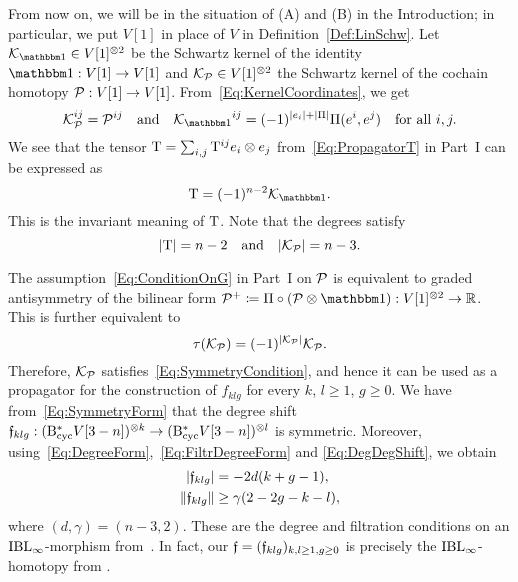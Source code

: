 \documentclass[\MainFolder/Text.tex]{subfiles}
\begin{document}
From now on, we will be in the situation of (A) and (B) in the Introduction; in particular, we put $V[1]$ in place of $V$ in Definition~\ref{Def:LinSchw}. Let $\Kern_{\Id} \in V[1]^{\otimes 2}$ be the Schwartz kernel of the identity $\Id: V[1]\rightarrow V[1]$ and $\mathcal{K}_{\mathcal{P}} \in V[1]^{\otimes 2}$ the Schwartz kernel of the cochain homotopy $\mathcal{P}: V[1] \rightarrow V[1]$. From~\eqref{Eq:KernelCoordinates}, we get
\begin{equation*} 
\Kern_{\Htp}^{ij} = \Htp^{ij} \quad \text{and} \quad {\Kern_{\Id}}^{ij} = (-1)^{\Abs{e_i} + \Abs{\Pair}} \Pair(e^i,e^j)\quad\text{for all }i,j. 
\end{equation*}
We see that the tensor $\mathrm{T} = \sum_{i,j} \mathrm{T}^{ij} e_i \otimes e_j$ from~\eqref{Eq:PropagatorT} in Part~I can be expressed as
\begin{equation*}
\TKer = (-1)^{n-2} \Kern_{\Id}.
\end{equation*}
This is the invariant meaning of $\mathrm{T}$. Note that the degrees satisfy 
$$ |\mathrm{T}| = n-2\quad\text{and}\quad |\mathcal{K}_{\mathcal{P}}| = n - 3. $$

The assumption~\eqref{Eq:ConditionOnG} in Part~I on $\mathcal{P}$ is equivalent to graded antisymmetry of the bilinear form $\Htp^+\coloneqq \Pair\circ (\Htp\otimes \Id): V[1]^{\otimes 2} \rightarrow \R$. This is further equivalent to
$$ \tau(\mathcal{K}_{\mathcal{P}}) = (-1)^{|\mathcal{K}_{\mathcal{P}}|}\mathcal{K}_{\mathcal{P}}. $$
Therefore, $\mathcal{K}_{\mathcal{P}}$ satisfies~\eqref{Eq:SymmetryCondition}, and hence it can be used as a propagator for the construction of $f_{klg}$ for every $k$, $l\ge 1$, $g\ge 0$. We have from~\eqref{Eq:SymmetryForm} that the degree shift $\mathfrak{f}_{klg}: (\mathrm{B}_{\mathrm{cyc}}^* V[3-n])^{\otimes k} \rightarrow (\mathrm{B}_{\mathrm{cyc}}^* V[3-n])^{\otimes l}$ is symmetric. Moreover, using~\eqref{Eq:DegreeForm},~\eqref{Eq:FiltrDegreeForm} and \eqref{Eq:DegDegShift}, we obtain
$$\begin{aligned}
|\mathfrak{f}_{klg}| &= - 2d(k+g-1), \\
\| \mathfrak{f}_{klg} \|&\ge \gamma (2-2g-k-l),
\end{aligned}$$
where $(d,\gamma) = (n-3,2)$. These are the degree and filtration conditions on an $\mathrm{IBL}_\infty$-morphism from~\cite[Definition~2.8 and (8.3)]{Cieliebak2015}. In fact, our $\mathfrak{f}=(\mathfrak{f}_{klg})_{k,l\ge 1, g\ge 0}$ is precisely the $\mathrm{IBL}_\infty$-homotopy from \cite[Theorem 11.3]{Cieliebak2015}.
\end{document}
